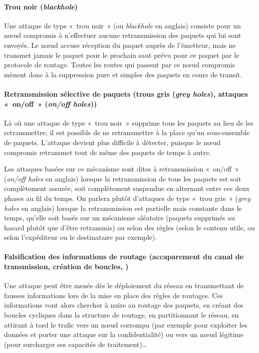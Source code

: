         \paragraph{Trou noir (\textit{blackhole})}
Une attaque de type « trou noir » (ou \textit{blackhole} en anglais) consiste pour un nœud compromis à n'effectuer aucune retransmission des paquets qui lui sont envoyés.
Le nœud accuse réception du paquet auprès de l'émetteur, mais ne transmet jamais le paquet pour le prochain saut prévu pour ce paquet par le protocole de routage.
Toutes les routes qui passent par ce nœud compromis mènent donc à la suppression pure et simples des paquets en cours de transit.

        \paragraph{Retransmission sélective de paquets (trous gris (\textit{grey holes}), attaques « on/off » (\textit{on/off holes}))}
Là où une attaque de type « trou noir » supprime tous les paquets au lieu de les retransmettre, il est possible de ne retransmettre à la place qu'un sous-ensemble de paquets.
L'attaque devient plus difficile à détecter, puisque le nœud compromis retransmet tout de même des paquets de temps à autre.

Les attaques basées sur ce mécanisme sont dites à retransmission « on/off » (\textit{on/off holes} en anglais) lorsque la retransmission de tous les paquets est soit complètement assurée, soit complètement suspendue en alternant entre ces deux phases au fil du temps.
On parlera plutôt d'attaques de type « trou gris » (\textit{grey holes} en anglais) lorsque la retransmission est partielle mais constante dans le temps, qu'elle soit basée sur un mécanisme aléatoire (paquets supprimés au hasard plutôt que d'être retransmis) ou selon des règles (selon le contenu utile, ou selon l'expéditeur ou le destinataire par exemple).

        \paragraph{Falsification des informations de routage (accaparement du canal de transmission, création de boucles, \etc)}
Une attaque peut être menée dès le déploiement du réseau en transmettant de fausses informations lors de la mise en place des règles de routages.
Ces informations vont alors chercher à nuire au routage des paquets, en créant des boucles cycliques dans la structure de routage, en partitionnant le réseau, en attirant à tord le trafic vers un nœud corrompu (par exemple pour exploiter les données et porter une attaque sur la confidentialité) ou vers un nœud légitime (pour surcharger ses capacités de traitement)\dots

